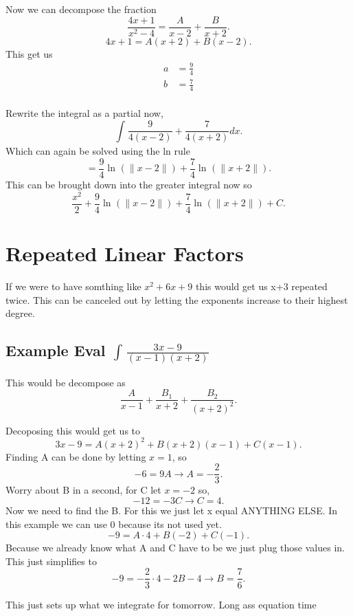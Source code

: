 \documentclass[a4paper]{article}
\begin{document}
Now we can decompose the fraction
\[
\frac{4x+1}{x^2-4}=\frac{A}{x-2}+\frac{B}{x+2}
.\] 
\[
4x+1=A(x+2)+B(x-2)
.\] 
This get us 
\begin{align*}
  a&= \frac{9}{4} \\
  b&= \frac{7}{4} \\
\end{align*}

Rewrite the integral as a partial now,
\[
\int_{}^{} \frac{9}{4(x-2)}+\frac{7}{4(x+2)}dx 
.\] 
Which can again be solved using the ln rule
\[
=\frac{9}{4}\ln^{}(\|x-2\|)+\frac{7}{4}\ln^{}(\|x+2\|)
.\] 
This can be brought down into the greater integral now so
\[
\frac{x^2}{2}+ \frac{9}{4}\ln^{}(\|x-2\|)+\frac{7}{4}\ln^{}(\|x+2\|)+C
.\] 

\section{Repeated Linear Factors}%
\label{sec:Repeated Linear Factors}

If we were to have somthing like $x^2+6x+9$ this would get us x+3 repeated twice. This can be canceled out by letting the exponents increase to their highest degree.
\subsection{Example Eval $\int_{}^{} \frac{3x-9}{(x-1)(x+2)} $}%

This would be decompose as
\[
\frac{A}{x-1}+\frac{B_{1}}{x+2}+\frac{B_{2}}{(x+2)^2}
.\] 
\newpage

Decoposing this would get us to 
\[
3x-9=A(x+2)^2+B(x+2)(x-1)+C(x-1)
.\] 
Finding A can be done by letting $x=1$, so 
\[
-6=9A \to A=-\frac{2}{3}
.\] 
Worry about B in a second, for C let $x=-2$ so,
\[
-12=-3C \to C=4
.\] 
Now we need to find the B. For this we just let x equal ANYTHING ELSE. In this example we can use 0 because its not used yet.
\[
-9=A\cdot 4 + B(-2)+C(-1)
.\] 
Because we already know what A and C have to be we just plug those values in.
This just simplifies to 
\[
-9=-\frac{2}{3}\cdot 4 - 2B- 4 \to B=\frac{7}{6}
.\] 

This just sets up what we integrate for tomorrow. Long ass equation time
\end{document}
